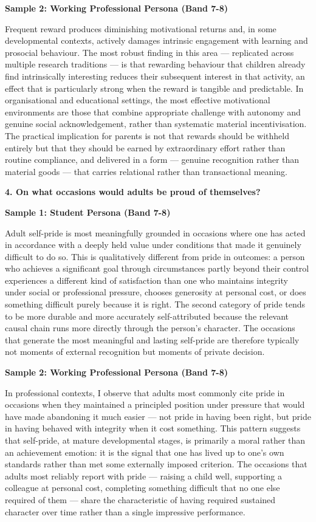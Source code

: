 \textbf{Sample 2: Working Professional Persona (Band 7-8)}

Frequent reward produces diminishing motivational returns and, in some developmental contexts, actively damages intrinsic engagement with learning and prosocial behaviour. The most robust finding in this area — replicated across multiple research traditions — is that rewarding behaviour that children already find intrinsically interesting reduces their subsequent interest in that activity, an effect that is particularly strong when the reward is tangible and predictable. In organisational and educational settings, the most effective motivational environments are those that combine appropriate challenge with autonomy and genuine social acknowledgement, rather than systematic material incentivisation. The practical implication for parents is not that rewards should be withheld entirely but that they should be earned by extraordinary effort rather than routine compliance, and delivered in a form — genuine recognition rather than material goods — that carries relational rather than transactional meaning.

\separator

\begin{ieltsquestion}
\textbf{4. On what occasions would adults be proud of themselves?}
\end{ieltsquestion}
\textbf{Sample 1: Student Persona (Band 7-8)}

Adult self-pride is most meaningfully grounded in occasions where one has acted in accordance with a deeply held value under conditions that made it genuinely difficult to do so. This is qualitatively different from pride in outcomes: a person who achieves a significant goal through circumstances partly beyond their control experiences a different kind of satisfaction than one who maintains integrity under social or professional pressure, chooses generosity at personal cost, or does something difficult purely because it is right. The second category of pride tends to be more durable and more accurately self-attributed because the relevant causal chain runs more directly through the person's character. The occasions that generate the most meaningful and lasting self-pride are therefore typically not moments of external recognition but moments of private decision.

\textbf{Sample 2: Working Professional Persona (Band 7-8)}

In professional contexts, I observe that adults most commonly cite pride in occasions when they maintained a principled position under pressure that would have made abandoning it much easier — not pride in having been right, but pride in having behaved with integrity when it cost something. This pattern suggests that self-pride, at mature developmental stages, is primarily a moral rather than an achievement emotion: it is the signal that one has lived up to one's own standards rather than met some externally imposed criterion. The occasions that adults most reliably report with pride — raising a child well, supporting a colleague at personal cost, completing something difficult that no one else required of them — share the characteristic of having required sustained character over time rather than a single impressive performance.

